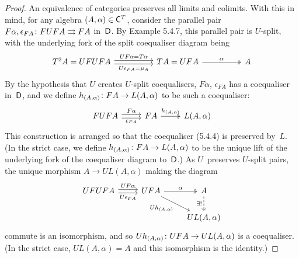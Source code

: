 \documentclass[../../solutions]{subfiles}
\begin{document}
\begin{proof}[Proof]
  An equivalence of categories preserves all limits and colimits.
  With this in mind, for any algebra $(A,\alpha)\in{\mathsf{C}}^T$, consider
  the parallel pair ${F\alpha,\epsilon_{FA}}\colon{FUFA}\rightrightarrows{FA}$
  in~${\mathsf{D}}$.  By Example 5.4.7, this parallel pair is $U$-split, with
  the underlying fork of the split coequaliser diagram being
  \begin{equation}
    \label{eq:5-5-thm1-1}
    \begin{tikzcd}[column sep=huge]
      T^2A=UFUFA
      \ar[r, shift left=0.5ex, "UF\alpha=T\alpha"]
      \ar[r, shift right=0.5ex, "U\epsilon_{FA}=\mu_A"']
      & TA=UFA
      \ar[r, twoheadrightarrow, "\alpha"]
      & A
    \end{tikzcd}
  \end{equation}
  By the hypothesis that $U$ creates $U$-split coequalisers,
  $F\alpha$, $\epsilon_{FA}$ has a coequaliser in~${\mathsf{D}}$, and we define
  ${h_{(A,\alpha)}}\colon{FA}\to{L(A,\alpha)}$ to be such a coequaliser:
  \begin{equation}
    \label{eq:5-5-thm1-2}
    \begin{tikzcd}
      FUFA
      \ar[r, shift left=0.5ex, "F\alpha"]
      \ar[r, shift right=0.5ex, "\epsilon_{FA}"']
      & FA
      \ar[r, twoheadrightarrow, "h_{(A,\alpha)}"]
      & L(A,\alpha)
    \end{tikzcd}
  \end{equation}
  This construction is arranged so that the coequaliser (5.4.4) is
  preserved by~$L$.  (In the strict case, we define
  ${h_{(A,\alpha)}}\colon{FA}\to{L(A,\alpha)}$ to be the unique lift of
  the underlying fork of the coequaliser diagram to~${\mathsf{D}}$.)
  As $U$~preserves $U$-split pairs, the unique morphism $A\to
  UL(A,\alpha)$ making the diagram
  \begin{equation}
    \label{eq:5-5-thm1-3}
    \begin{tikzcd}
      UFUFA
      \ar[r, shift left=0.5ex, "UF\alpha"]
      \ar[r, shift right=0.5ex, "U\epsilon_{FA}"']
      & UFA
      \ar[r, twoheadrightarrow, "\alpha"]
      \ar[rd, "Uh_{(A,\alpha)}"']
      & A
      \ar[d, dashed, "\exists!"']
      \\
      && UL(A,\alpha)
    \end{tikzcd}
  \end{equation}
  commute is an isomorphism, and so
  ${Uh_{(A,\alpha)}}\colon{UFA}\to{UL(A,\alpha)}$ is a coequaliser.  (In
  the strict case, $UL(A,\alpha)=A$ and this isomorphism is the
  identity.)


\end{proof}
\end{document}
